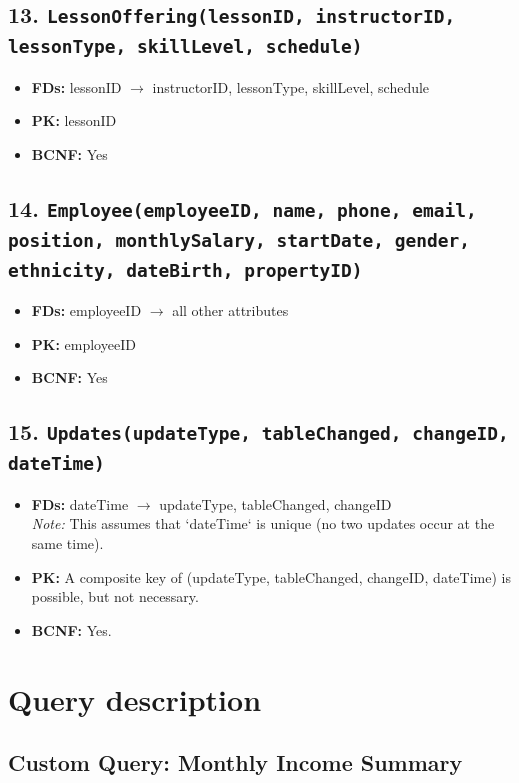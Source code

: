 \documentclass[11pt]{scrartcl}
\begin{document}
\subsection*{13. \texttt{LessonOffering(lessonID, instructorID, lessonType, skillLevel, schedule)}}
\begin{itemize}
  \item \textbf{FDs:} lessonID $\rightarrow$ instructorID, lessonType, skillLevel, schedule
  \item \textbf{PK:} lessonID
  \item \textbf{BCNF:} Yes
\end{itemize}

\subsection*{14. \texttt{Employee(employeeID, name, phone, email, position, monthlySalary, startDate, gender, ethnicity, dateBirth, propertyID)}}
\begin{itemize}
  \item \textbf{FDs:} employeeID $\rightarrow$ all other attributes
  \item \textbf{PK:} employeeID
  \item \textbf{BCNF:} Yes
\end{itemize}

\subsection*{15. \texttt{Updates(updateType, tableChanged, changeID, dateTime)}}
\begin{itemize}
  \item \textbf{FDs:} dateTime $\rightarrow$ updateType, tableChanged, changeID \\
        \textit{Note:} This assumes that `dateTime` is unique (no two updates occur at the same time).
  \item \textbf{PK:} A composite key of (updateType, tableChanged, changeID, dateTime) is possible, but not necessary.
  \item \textbf{BCNF:} Yes.
\end{itemize}

\section{Query description}
\subsection{Custom Query: Monthly Income Summary}
\end{document}
